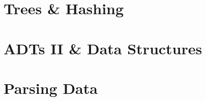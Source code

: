 










\chapter{Trees \& Hashing}










\chapter{ADTs II \& Data Structures }







\chapter{Parsing Data}

\newcommand{\bb}{white}
\newcommand{\ff}{black}

\newcommand{\sixel}[6]{%
\begin{tikzpicture}[scale=0.333, every node/.style={scale=0.333}]
\matrix[sixelstyle]
{
|[fill=#1]| \& |[fill=#2]| \\
|[fill=#3]| \& |[fill=#4]| \\
|[fill=#5]| \& |[fill=#6]| \\
};
\end{tikzpicture}%
}

\newcommand{\sepsix}[6]{%
\begin{tikzpicture}[scale=0.333, every node/.style={scale=0.333}]
\matrix[sepsixstyle]
{
|[fill=#1]| \& |[fill=#2]| \\
|[fill=#3]| \& |[fill=#4]| \\
|[fill=#5]| \& |[fill=#6]| \\
};
\end{tikzpicture}%
}




